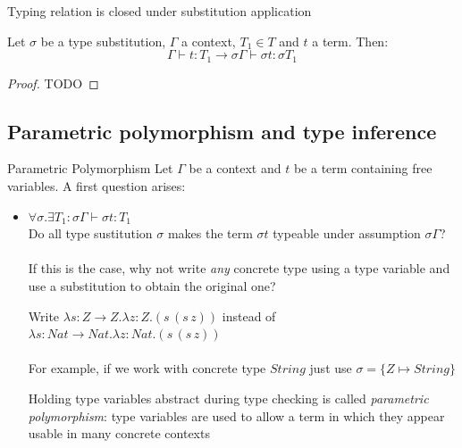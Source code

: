 \documentclass[8pt]{beamer}
\begin{document}
\begin{frame}{Typing relation is closed under substitution application}
    \begin{theorem}
        Let $\sigma$ be a type substitution, $\Gamma$ a context, 
        $T_1 \in T$ and $t$ a term. Then:
        \begin{displaymath}
            \Gamma \vdash t:T_1 \rightarrow \sigma\Gamma \vdash \sigma t: \sigma T_1
        \end{displaymath}
    \end{theorem}
    \begin{proof}
        TODO
    \end{proof}
\end{frame}

\subsection{Parametric polymorphism and type inference}

\begin{frame}{Parametric Polymorphism}
    Let $\Gamma$ be a context and $t$ be a term containing free variables.
    A first question arises:
    \begin{itemize}
        \item $\forall \sigma. \exists T_1: 
            \sigma \Gamma \vdash \sigma t : T_1$\\
            {\footnotesize Do all type sustitution $\sigma$ makes the term 
                $\sigma t$ typeable under assumption $\sigma \Gamma$?}\\~\\
            If this is the case, why not write \emph{any} concrete type
            using a type variable and use a substitution to obtain the 
            original one? 
            \pause
            \begin{example}
                Write $\lambda s:Z \rightarrow Z.\lambda z:Z.(s\, (s\, z))$
                instead of $\lambda s:Nat \rightarrow Nat.
                    \lambda z:Nat.(s\, (s\, z))$ \\~\\
                For example, if we work with concrete type $String$ just use 
                $\sigma = \{Z \mapsto String\} $
            \end{example}
            \pause
            Holding type variables abstract during type checking is called
            \emph{parametric polymorphism}: type variables are used to allow
            a term in which they appear usable in many concrete contexts
    \end{itemize}
\end{frame}
\end{document}
